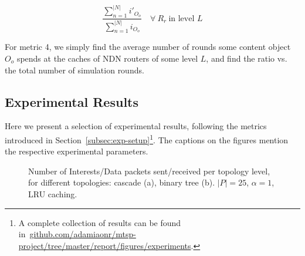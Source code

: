 \begin{equation}
    \frac{\sum_{n=1}^{|N|} i'_{O_o}}{\sum_{n=1}^{|N|} i_{O_o}} \quad \forall \ R_r \ \text{in level $L$}
    \label{eq:exp-setup-metrics-2}
\end{equation}\shortvertbreak

For metric 4, we simply find the average number of rounds 
some content object $O_o$ spends at the caches of NDN routers of some level $L$, and find 
the ratio vs. the total number of simulation rounds.

\subsection{Experimental Results}
\label{subsec:exp-results}

Here we present a selection of experimental results, following the metrics 
introduced in Section~\ref{subsec:exp-setup}\footnote{A complete collection of 
results can be found in~\url{github.com/adamiaonr/mtsp-project/tree/master/report/figures/experiments}.}. 
The captions on the figures mention the respective experimental parameters.\shortvertbreak


\begin{figure}[h!]
    \centering


    \cprotect\caption{Number of Interests\slash Data packets sent\slash received 
        per topology level, for different topologies: cascade (a), binary tree (b). 
        $|P| = 25$, $\alpha = 1$, LRU caching.}
    \label{fig:exp-results-topologies}

\end{figure}

